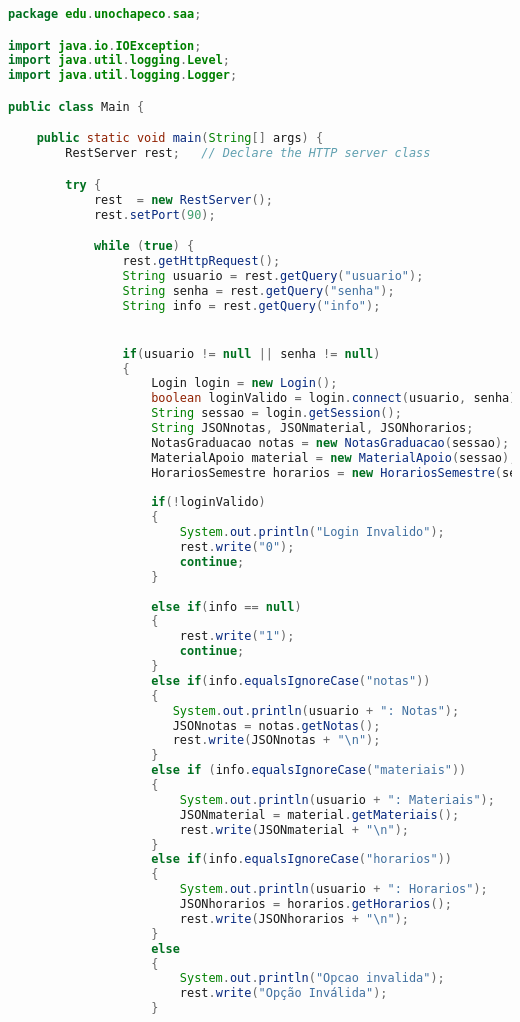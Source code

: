 \begin{lstlisting}[language=java, frame=single]
package edu.unochapeco.saa;

import java.io.IOException;
import java.util.logging.Level;
import java.util.logging.Logger;

public class Main {

    public static void main(String[] args) {
        RestServer rest;   // Declare the HTTP server class

        try { 
            rest  = new RestServer();  
            rest.setPort(90);

            while (true) {
                rest.getHttpRequest();     
                String usuario = rest.getQuery("usuario");
                String senha = rest.getQuery("senha");
                String info = rest.getQuery("info");


                if(usuario != null || senha != null)
                {
                    Login login = new Login();
                    boolean loginValido = login.connect(usuario, senha);
                    String sessao = login.getSession();
                    String JSONnotas, JSONmaterial, JSONhorarios;
                    NotasGraduacao notas = new NotasGraduacao(sessao);
                    MaterialApoio material = new MaterialApoio(sessao);
                    HorariosSemestre horarios = new HorariosSemestre(sessao);
                                        
                    if(!loginValido)
                    {
                        System.out.println("Login Invalido");
                        rest.write("0");
                        continue;
                    }
                    
                    else if(info == null)
                    {
                        rest.write("1");
                        continue;
                    }
                    else if(info.equalsIgnoreCase("notas"))
                    {
                       System.out.println(usuario + ": Notas");
                       JSONnotas = notas.getNotas();
                       rest.write(JSONnotas + "\n");
                    }
                    else if (info.equalsIgnoreCase("materiais"))
                    {
                        System.out.println(usuario + ": Materiais");
                        JSONmaterial = material.getMateriais();
                        rest.write(JSONmaterial + "\n");
                    }
                    else if(info.equalsIgnoreCase("horarios"))
                    {
                        System.out.println(usuario + ": Horarios");
                        JSONhorarios = horarios.getHorarios();
                        rest.write(JSONhorarios + "\n");
                    }
                    else
                    {
                        System.out.println("Opcao invalida");
                        rest.write("Opção Inválida");
                    }
                    

\end{lstlisting}
